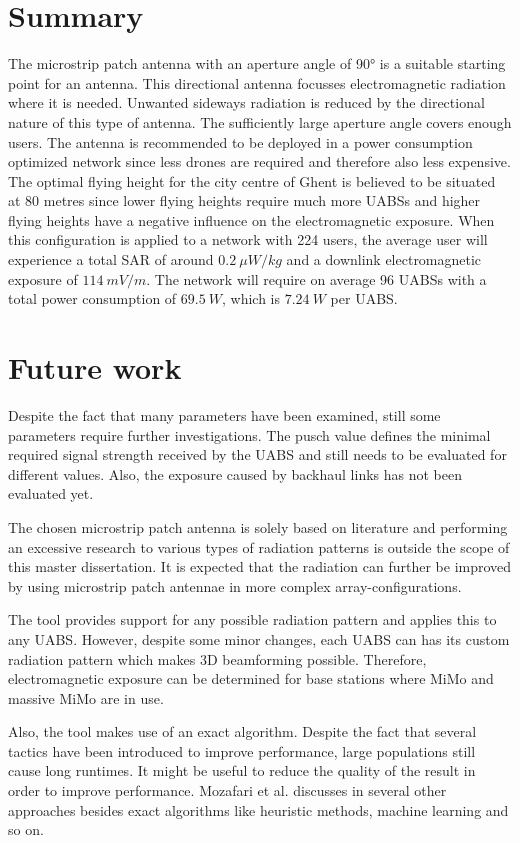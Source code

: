 \section{Summary}
The microstrip patch antenna with an aperture angle of \ang{90} is a suitable starting point for an antenna. 
This directional antenna focusses electromagnetic radiation where it is needed. Unwanted sideways radiation 
is reduced by the directional nature of this type of antenna.
The sufficiently large aperture angle covers enough users. The antenna is recommended to be deployed in a power consumption 
optimized network since less drones are required and therefore also less expensive.
The optimal flying height for the city centre of Ghent is believed to be situated at 80 metres since lower flying heights require much more \gls{UABS}s and
higher flying heights have a negative influence on the electromagnetic exposure.  
When this configuration is applied to a network with 224 users, the average user will 
experience a total SAR of around $0.2\ \mu W/kg$ and
 a downlink electromagnetic exposure of $114\ mV/m$. The network will require on average 96 UABSs with a total
power consumption of $69.5\ W$, which is $7.24\ W$ per UABS.

\section{Future work}

Despite the fact that many parameters have been examined, still some parameters require further investigations.
The \gls{pusch} value defines the minimal required signal strength received by the \gls{UABS} and still needs to be evaluated
for different values. Also, the exposure caused by backhaul links has not been evaluated yet.

The chosen microstrip patch antenna is solely based on literature and performing an excessive research to various 
types of radiation patterns is outside the scope of this master dissertation. It is expected that the radiation can 
further be improved by using microstrip patch antennae in more complex array-configurations. 

The tool provides support for any possible radiation pattern and applies this to any \gls{UABS}.
However, despite some minor changes, each \gls{UABS} can has its custom radiation pattern which makes 
3D beamforming possible. Therefore, electromagnetic exposure can be determined for base stations where MiMo
and massive MiMo are in use.

Also, the tool makes use of an \gls{exact algorithm}. Despite the fact that several  
tactics have been introduced to improve performance, large populations still cause long runtimes. It might be useful 
to reduce the quality of the result in order to improve performance. Mozafari et al. discusses in \cite{U3} several 
other approaches besides \gls{exact algorithm}s like heuristic methods, machine learning and so on.
